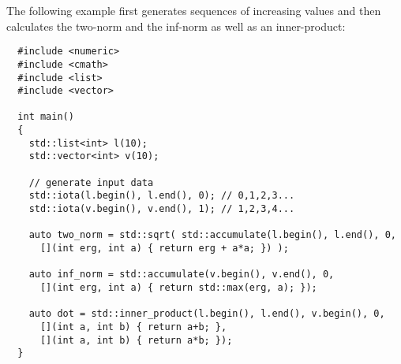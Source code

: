 \begin{example}
  The following example first generates sequences of increasing values and then calculates the two-norm and the inf-norm as well as
  an inner-product:
  \begin{verbatim}
  #include <numeric>
  #include <cmath>
  #include <list>
  #include <vector>

  int main()
  {
    std::list<int> l(10);
    std::vector<int> v(10);

    // generate input data
    std::iota(l.begin(), l.end(), 0); // 0,1,2,3...
    std::iota(v.begin(), v.end(), 1); // 1,2,3,4...

    auto two_norm = std::sqrt( std::accumulate(l.begin(), l.end(), 0,
      [](int erg, int a) { return erg + a*a; }) );

    auto inf_norm = std::accumulate(v.begin(), v.end(), 0,
      [](int erg, int a) { return std::max(erg, a); });

    auto dot = std::inner_product(l.begin(), l.end(), v.begin(), 0,
      [](int a, int b) { return a+b; },
      [](int a, int b) { return a*b; });
  }
  \end{verbatim}
\end{example}
